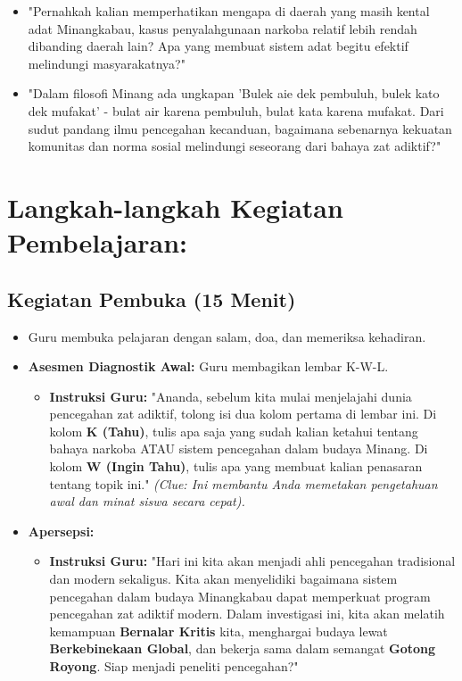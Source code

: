 \documentclass[a4paper,12pt]{article}
\begin{document}
\begin{itemize}
\item "Pernahkah kalian memperhatikan mengapa di daerah yang masih kental adat Minangkabau, kasus penyalahgunaan narkoba relatif lebih rendah dibanding daerah lain? Apa yang membuat sistem adat begitu efektif melindungi masyarakatnya?"
\item "Dalam filosofi Minang ada ungkapan 'Bulek aie dek pembuluh, bulek kato dek mufakat' - bulat air karena pembuluh, bulat kata karena mufakat. Dari sudut pandang ilmu pencegahan kecanduan, bagaimana sebenarnya kekuatan komunitas dan norma sosial melindungi seseorang dari bahaya zat adiktif?"
\end{itemize}

\section{Langkah-langkah Kegiatan Pembelajaran:}

\subsection{Kegiatan Pembuka (15 Menit)}
\begin{itemize}
\item Guru membuka pelajaran dengan salam, doa, dan memeriksa kehadiran.
\item \textbf{Asesmen Diagnostik Awal:} Guru membagikan lembar K-W-L.
    \begin{itemize}
    \item \textbf{Instruksi Guru:} "Ananda, sebelum kita mulai menjelajahi dunia pencegahan zat adiktif, tolong isi dua kolom pertama di lembar ini. Di kolom \textbf{K (Tahu)}, tulis apa saja yang sudah kalian ketahui tentang bahaya narkoba ATAU sistem pencegahan dalam budaya Minang. Di kolom \textbf{W (Ingin Tahu)}, tulis apa yang membuat kalian penasaran tentang topik ini." \textit{(Clue: Ini membantu Anda memetakan pengetahuan awal dan minat siswa secara cepat).}
    \end{itemize}
\item \textbf{Apersepsi:}
    \begin{itemize}
    \item \textbf{Instruksi Guru:} "Hari ini kita akan menjadi ahli pencegahan tradisional dan modern sekaligus. Kita akan menyelidiki bagaimana sistem pencegahan dalam budaya Minangkabau dapat memperkuat program pencegahan zat adiktif modern. Dalam investigasi ini, kita akan melatih kemampuan \textbf{Bernalar Kritis} kita, menghargai budaya lewat \textbf{Berkebinekaan Global}, dan bekerja sama dalam semangat \textbf{Gotong Royong}. Siap menjadi peneliti pencegahan?"
    \end{itemize}
\end{itemize}
\end{document}
